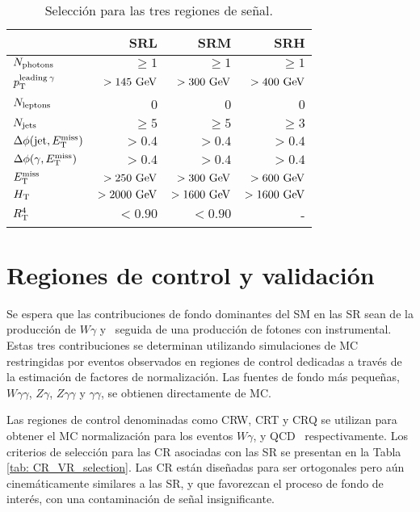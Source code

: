 \begin{table}[ht!]
  \centering
  \begin{tabular}{lrrr}
    \hline
    \hline
                                                    &        SRL    &       SRM     &         SRH \\
      \hline
      $N_{\text{photons}}$                        &        $\ge1$ &        $\ge1$ &        $\ge1$ \\
      $p_{\text{T}}^{\text{leading}\: \gamma}$                 &  $>145\ \gev$ &  $>300\ \gev$ &  $>400\ \gev$ \\
      $N_{\text{leptons}}$                        &             0 &             0 &             0 \\
      $N_{\text{jets}}$                           &       $\ge 5$ &       $\ge 5$ &       $\ge 3$ \\
      $\Delta\phi(\text{jet}, E_{\text{T}}^{\text{miss}})$                &        $>0.4$ &        $>0.4$ &        $>0.4$ \\
      $\Delta\phi(\gamma, E_{\text{T}}^{\text{miss}})$                    &        $>0.4$ &        $>0.4$ &        $>0.4$ \\
      $E_{\text{T}}^{\text{miss}}$                                       &  $>250\ \gev$ &  $>300\ \gev$ &  $>600\ \gev$ \\
      $H_{\text{T}}$                                         & $>2000\ \gev$ & $>1600\ \gev$ & $>1600\ \gev$ \\
      $R_{\text{T}}^{4}$                            &       $<0.90$ &       $<0.90$ &             - \\
      \hline
      \hline
    \end{tabular}
  \caption{Selección para las tres regiones de señal.}
  \label{tab:sr_selection}
\end{table}



\section{Regiones de control y validación}

Se espera que las contribuciones de fondo dominantes del SM en las SR sean de la
producción de $W \gamma$ y \ttbarph\, seguida de una producción de fotones con \met instrumental. Estas tres contribuciones se determinan utilizando simulaciones de MC restringidas por eventos observados en regiones de control dedicadas a través de la estimación de factores de normalización. Las fuentes de fondo más pequeñas,
$ W \gamma \gamma $, $ Z \gamma $, $ Z \gamma \gamma $ y $ \gamma \gamma $, se obtienen
directamente de MC.

Las regiones de control denominadas como CRW, CRT y CRQ se utilizan para obtener el MC
normalización para los eventos $ W \gamma $, \ttbarph y QCD \phj\, respectivamente.
Los criterios de selección para las CR asociadas con las SR se presentan en la Tabla \ref{tab: CR_VR_selection}. Las CR están diseñadas para ser ortogonales pero aún cinemáticamente similares a las SR, y que favorezcan el proceso de fondo de interés, con una contaminación de señal insignificante.

